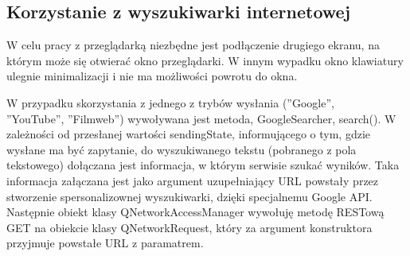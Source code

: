 \documentclass[twoside,a4paper]{book}
\begin{document}
\subsection{Korzystanie z wyszukiwarki internetowej}\label{sec:searcher}
W celu pracy z przeglądarką niezbędne jest podłączenie drugiego ekranu, na którym może się otwierać okno przeglądarki. W innym wypadku okno kla\-wia\-tu\-ry ulegnie minimalizacji i nie ma możliwości powrotu do okna.

W przypadku skorzystania z jednego z trybów wysłania (''Google'', \\''YouTube'', ''Filmweb'') wywoływana jest metoda, GoogleSearcher, search(). W zależności od przesłanej wartości sendingState, informującego o tym, gdzie wysłane ma być zapytanie, do wyszukiwanego tekstu (pobranego z pola tekstowego) dołączana jest informacja, w którym serwisie szukać wyników. Taka informacja załączana jest jako argument uzupełniający URL powstały przez stworzenie spersonalizownej wyszukiwarki, dzięki spe\-cja\-lne\-mu Google API. Następnie obiekt klasy QNetworkAccessManager wywołuję metodę RESTową GET na obiekcie klasy QNetworkRequest, który za argument konstruktora przyjmuje powstałe URL z paramatrem.
\end{document}

